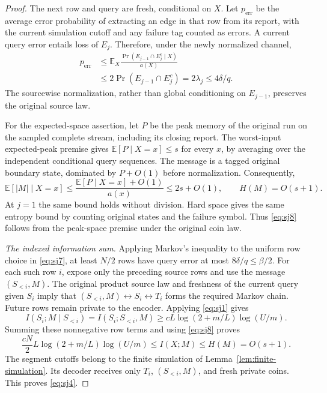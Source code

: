 \documentclass[11pt,letterpaper]{article}
\numberwithin{equation}{section}
\newcommand{\E}{\mathbb E}
\begin{document}
\begin{proof}
The next row and query are fresh, conditional on $X$.
Let $p_{\mathrm{err}}$ be the average error probability of extracting an edge in that row from its report, with the current simulation cutoff and any failure tag counted as errors.
A current query error entails loss of $E_j$.
Therefore, under the newly normalized channel,
\begin{equation}
\begin{split}
 p_{\mathrm{err}}
 &\le\E_X
       \frac{\Pr(E_{j-1}\cap E_j^c\mid X)}{a(X)}\\
 &\le2\Pr(E_{j-1}\cap E_j^c)
  =2\lambda_j\le4\delta/q.
 \end{split}
 \label{eq:sj7}
\end{equation}
The sourcewise normalization, rather than global conditioning on $E_{j-1}$, preserves the original source law.

For the expected-space assertion, let $P$ be the peak memory of the original run on the sampled complete stream, including its closing report.
The worst-input expected-peak premise gives $\E[P\mid X=x]\le s$ for every $x$, by averaging over the independent conditional query sequences.
The message is a tagged original boundary state, dominated by $P+O(1)$ before normalization.
Consequently,
\begin{equation}
\E[|M|\mid X=x]
 \le\frac{\E[P\mid X=x]+O(1)}{a(x)}
 \le2s+O(1),\qquad H(M)=O(s+1).                    \label{eq:sj8}
\end{equation}
At $j=1$ the same bound holds without division.
Hard space gives the same entropy bound by counting original states and the failure symbol.
Thus \eqref{eq:sj8} follows from the peak-space premise under the original coin law.

\emph{The indexed information sum.} Applying Markov's inequality to the uniform row choice in \eqref{eq:sj7}, at least $N/2$ rows have query error at most $8\delta/q\le\beta/2$.
For each such row $i$, expose only the preceding source rows and use the message $(S_{<i},M)$.
The original product source law and freshness of the current query given $S_i$ imply that $(S_{<i},M)\leftrightarrow S_i\leftrightarrow T_i$ forms the required Markov chain.
Future rows remain private to the encoder.
Applying \eqref{eq:sj1} gives
\[
 I(S_i;M\mid S_{<i})
 =I(S_i;S_{<i},M)
 \ge cL\log(2+m/L)\log(U/m).
\]
Summing these nonnegative row terms and using \eqref{eq:sj8} proves
\[
 \frac{cN}{2}L\log(2+m/L)\log(U/m)
 \le I(X;M)\le H(M)=O(s+1).
\]
The segment cutoffs belong to the finite simulation of Lemma~\ref{lem:finite-simulation}.
Its decoder receives only $T_i$, $(S_{<i},M)$, and fresh private coins.
This proves \eqref{eq:sj4}.
\end{proof}
\end{document}

